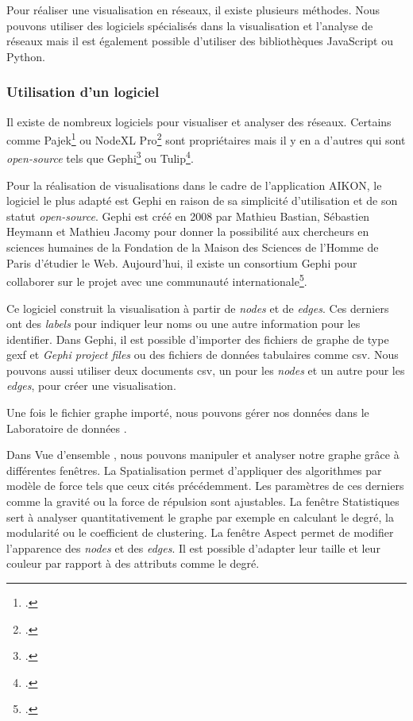 Pour réaliser une visualisation en réseaux, il existe plusieurs méthodes. Nous pouvons utiliser des logiciels spécialisés dans la visualisation et l'analyse de réseaux mais il est également possible d'utiliser des bibliothèques JavaScript ou Python. 

\subsubsection{Utilisation d'un logiciel}

Il existe de nombreux logiciels pour visualiser et analyser des réseaux. Certains comme Pajek\footcite{merckleAnalyseReseauxIntroduction2020} ou NodeXL Pro\footcite{NodeXLYourGoto2024} sont propriétaires mais il y en a d'autres qui sont \textit{open-source} tels que Gephi\footcite{GephiOpenGraph} ou Tulip\footcite{tulip-devTulip2025}.

Pour la réalisation de visualisations dans le cadre de l'application AIKON, le logiciel le plus adapté est Gephi en raison de sa simplicité d'utilisation et de son statut \textit{open-source}. Gephi est créé en 2008 par Mathieu Bastian, Sébastien Heymann et Mathieu Jacomy pour donner la possibilité aux chercheurs en sciences humaines de la Fondation de la Maison des Sciences de l'Homme de Paris d'étudier le Web. Aujourd'hui, il existe un consortium Gephi pour collaborer sur le projet avec une communauté internationale\footcite{heymannGephi2014}.

Ce logiciel construit la visualisation à partir de \textit{nodes} et de \textit{edges}. Ces derniers ont des \textit{labels} pour indiquer leur noms ou une autre information pour les identifier. Dans Gephi, il est possible d'importer des fichiers de graphe de type \gls{gexf} et \textit{Gephi project files} ou des fichiers de données tabulaires comme \gls{csv}. Nous pouvons aussi utiliser deux documents \gls{csv}, un pour les \textit{nodes} et un autre pour les \textit{edges}, pour créer une visualisation. 

Une fois le fichier graphe importé, nous pouvons gérer nos données dans le \og Laboratoire de données \fg.

Dans \og Vue d'ensemble \fg, nous pouvons manipuler et analyser notre graphe grâce à différentes fenêtres. La \og Spatialisation \fg permet d'appliquer des algorithmes par modèle de force tels que ceux cités précédemment. Les paramètres de ces derniers comme la gravité ou la force de répulsion sont ajustables. La fenêtre \og Statistiques \fg sert à analyser quantitativement le graphe par exemple en calculant le degré, la modularité ou le coefficient de clustering. La fenêtre \og Aspect \fg permet de modifier l'apparence des \textit{nodes} et des \textit{edges}. Il est possible d'adapter leur taille et leur couleur par rapport à des attributs comme le degré. 

